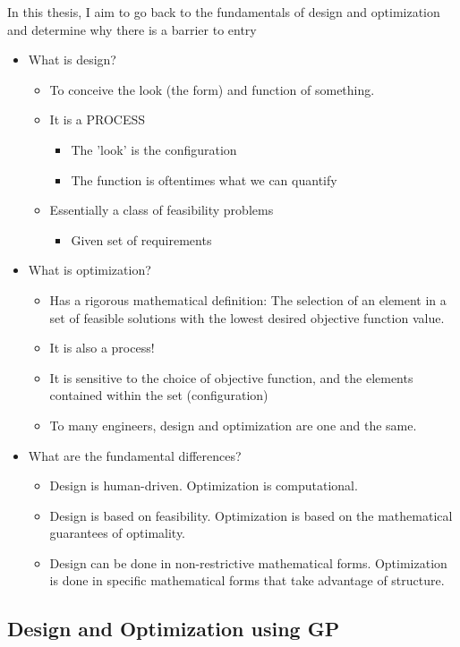 \documentclass{aiaa-pretty}
\begin{document}
In this thesis, I aim to go back to the fundamentals of design and optimization and determine why there is a barrier to entry 
\begin{itemize}
\item What is design? 
\begin{itemize}
\item To conceive the look (the form) and function of something. 
\item It is a PROCESS
\begin{itemize}
	\item The 'look' is the configuration
	\item The function is oftentimes what we can quantify
\end{itemize}
\item Essentially a class of feasibility problems 
\begin{itemize}
\item Given set of requirements
\end{itemize}
\end{itemize}
\item What is optimization?
\begin{itemize}
\item Has a rigorous mathematical definition: The selection of an element in a set of feasible solutions with the lowest desired objective function value. 
\item It is also a process!
\item It is sensitive to the choice of objective function, and the elements contained within the set (configuration)
\item To many engineers, design and optimization are one and the same. 
\end{itemize}
\item What are the fundamental differences? 
\begin{itemize}
\item Design is human-driven. Optimization is computational. 
\item Design is based on feasibility. Optimization is based on the mathematical guarantees of optimality. 
\item Design can be done in non-restrictive mathematical forms. Optimization is done in specific mathematical forms that take advantage of structure. 
\end{itemize}
\end{itemize}
\subsection{Design and Optimization using \gls{GP}}
\end{document}
